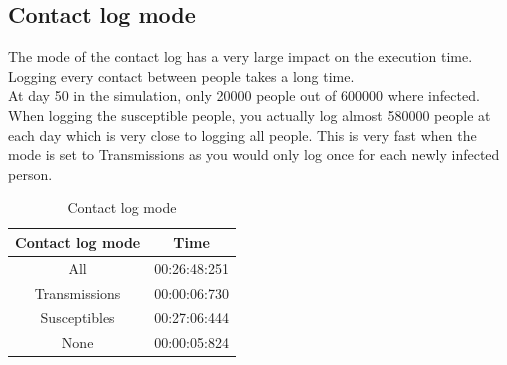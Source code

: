 \documentclass[runningheads]{llncs}
\begin{document}
\subsection{Contact log mode}
The mode of the contact log has a very large impact on the execution time. Logging every contact between people takes a long time.\\
At day 50 in the simulation, only 20000 people out of 600000 where infected. When logging the susceptible people, you actually log almost 580000 people at each day which is very close to logging all people. This is very fast when the mode is set to Transmissions as you would only log once for each newly infected person.\\

\begin{table}[!h]
	\centering
	\begin{tabular}{|c|c|}
		\hline
		Contact log mode & Time \\\hline
   		All 			& 00:26:48:251 \\\hline
   		Transmissions 	& 00:00:06:730 \\\hline
   		Susceptibles 	& 00:27:06:444 \\\hline
   		None 			& 00:00:05:824 \\
    	\hline
	\end{tabular}
	\caption{Contact log mode}
\end{table}
\end{document}
